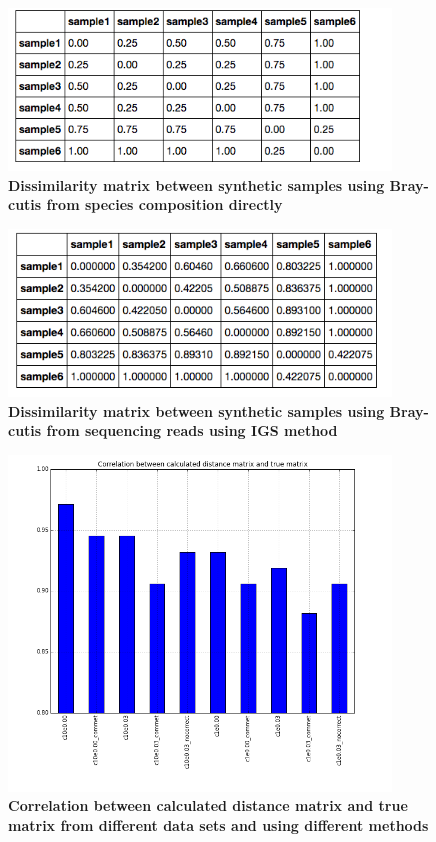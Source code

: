 \documentclass[12pt]{report}
\begin{document}


\begin{figure}[!ht]
 \centerline{\includegraphics[width=4in]{./figures/simulated_real_matrix.png}}
\caption{\bf Dissimilarity matrix between synthetic samples using Bray-cutis from species composition directly }
\label{fig:simulated_real_matrix}
\end{figure}


\begin{figure}[!ht]
 \centerline{\includegraphics[width=4in]{./figures/simulated_matrix1.png}}
\caption{\bf Dissimilarity matrix between synthetic samples using Bray-cutis from sequencing reads using IGS method }
\label{fig:simulated_matrix1}
\end{figure}

\begin{figure}[!ht]
 \centerline{\includegraphics[width=4in]{./figures/IGS_correlation_methods.png}}
\caption{\bf Correlation between calculated distance matrix and true matrix from different data sets and using different methods}
\label{fig:IGS_correlation_methods}
\end{figure}
\end{document}
